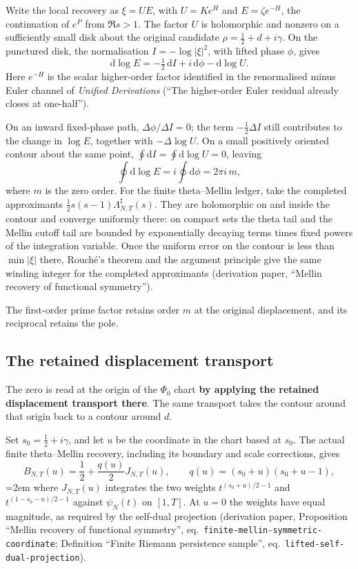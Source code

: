 \documentclass[11pt]{article}
\begin{document}
Write the local recovery as \(\xi=UE\), with \(U=K e^H\) and \(E=\zeta e^{-H}\), the continuation of \(e^P\) from \(\Re s>1\). The factor \(U\) is holomorphic and nonzero on a sufficiently small disk about the original candidate \(\rho=\tfrac12+d+i\gamma\). On the punctured disk, the normalisation \(I=-\log|\xi|^2\), with lifted phase \(\phi\), gives
\[
\boxed{\mathrm{d}\log E=-\tfrac12\,\mathrm{d}I
+i\,\mathrm{d}\phi-\mathrm{d}\log U.}
\]
Here \(e^{-H}\) is the scalar higher-order factor identified in the renormalised minus Euler channel of \emph{Unified Derivations} (``The higher-order Euler residual already closes at one-half'').

On an inward fixed-phase path, \(\Delta\phi/\Delta I=0\); the term \(-\tfrac12\Delta I\) still contributes to the change in \(\log E\), together with \(-\Delta\log U\). On a small positively oriented contour about the same point, \(\oint\mathrm{d}I=\oint\mathrm{d}\log U=0\), leaving
\[
\boxed{\oint\mathrm{d}\log E=i\oint\mathrm{d}\phi=2\pi i\,m,}
\]
where \(m\) is the zero order. For the finite theta--Mellin ledger, take the completed approximants \(\tfrac12s(s-1)\Lambda^\sharp_{N,T}(s)\). They are holomorphic on and inside the contour and converge uniformly there: on compact sets the theta tail and the Mellin cutoff tail are bounded by exponentially decaying terms times fixed powers of the integration variable. Once the uniform error on the contour is less than \(\min|\xi|\) there, Rouch\'e's theorem and the argument principle give the same winding integer for the completed approximants (derivation paper, ``Mellin recovery of functional symmetry'').

The first-order prime factor retains order \(m\) at the original displacement, and its reciprocal retains the pole.

\subsection{The retained displacement transport}

The zero is read at the origin of the \(\Phi_0\) chart \textbf{by applying the retained displacement transport there}. The same transport takes the contour around that origin back to a contour around \(d\).

Set \(s_0=\tfrac12+i\gamma\), and let \(u\) be the coordinate in the chart based at \(s_0\). The actual finite theta--Mellin recovery, including its boundary and scale corrections, gives
\[
B_{N,T}(u)=\frac12+\frac{q(u)}2J_{N,T}(u),
\qquad q(u)=(s_0+u)(s_0+u-1),
\]
\begingroup\emergencystretch=2em\relax
where \(J_{N,T}(u)\) integrates the two weights \(t^{(s_0+u)/2-1}\) and \(t^{(1-s_0-u)/2-1}\) against \(\psi_N(t)\) on \([1,T]\). At \(u=0\) the weights have equal magnitude, as required by the self-dual projection (derivation paper, Proposition ``Mellin recovery of functional symmetry'', eq.~\texttt{finite-\allowbreak mellin-\allowbreak symmetric-\allowbreak coordinate}; Definition ``Finite Riemann persistence sample'', eq.~\texttt{lifted-\allowbreak self-\allowbreak dual-\allowbreak projection}).\par\endgroup
\end{document}
